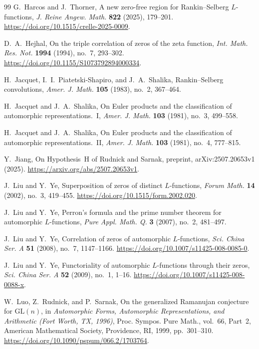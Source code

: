 \documentclass[11pt,reqno]{amsart}
\numberwithin{equation}{section}
\theoremstyle{definition}
\theoremstyle{remark}
\begin{document}
\begin{thebibliography}{99}
G.~Harcos and J.~Thorner,
A new zero-free region for Rankin--Selberg $L$-functions,
\emph{J. Reine Angew. Math.} \textbf{822} (2025), 179--201.
\url{https://doi.org/10.1515/crelle-2025-0009}.

D.~A.~Hejhal,
On the triple correlation of zeros of the zeta function,
\emph{Int. Math. Res. Not.} \textbf{1994} (1994), no.~7, 293--302.
\url{https://doi.org/10.1155/S1073792894000334}.

H.~Jacquet, I.~I.~Piatetski-Shapiro, and J.~A.~Shalika,
Rankin--Selberg convolutions,
\emph{Amer. J. Math.} \textbf{105} (1983), no.~2, 367--464.

H.~Jacquet and J.~A.~Shalika,
On Euler products and the classification of automorphic representations.~I,
\emph{Amer. J. Math.} \textbf{103} (1981), no.~3, 499--558.

H.~Jacquet and J.~A.~Shalika,
On Euler products and the classification of automorphic representations.~II,
\emph{Amer. J. Math.} \textbf{103} (1981), no.~4, 777--815.

Y.~Jiang,
On Hypothesis~H of Rudnick and Sarnak,
preprint, arXiv:2507.20653v1 (2025).
\url{https://arxiv.org/abs/2507.20653v1}.

J.~Liu and Y.~Ye,
Superposition of zeros of distinct $L$-functions,
\emph{Forum Math.} \textbf{14} (2002), no.~3, 419--455.
\url{https://doi.org/10.1515/form.2002.020}.

J.~Liu and Y.~Ye,
Perron's formula and the prime number theorem for automorphic $L$-functions,
\emph{Pure Appl. Math. Q.} \textbf{3} (2007), no.~2, 481--497.

J.~Liu and Y.~Ye,
Correlation of zeros of automorphic $L$-functions,
\emph{Sci. China Ser. A} \textbf{51} (2008), no.~7, 1147--1166.
\url{https://doi.org/10.1007/s11425-008-0085-0}.

J.~Liu and Y.~Ye,
Functoriality of automorphic $L$-functions through their zeros,
\emph{Sci. China Ser. A} \textbf{52} (2009), no.~1, 1--16.
\url{https://doi.org/10.1007/s11425-008-0088-x}.

W.~Luo, Z.~Rudnick, and P.~Sarnak,
On the generalized Ramanujan conjecture for $\mathrm{GL}(n)$,
in \emph{Automorphic Forms, Automorphic Representations, and Arithmetic
(Fort Worth, TX, 1996)},
Proc. Sympos. Pure Math., vol.~66, Part~2,
American Mathematical Society, Providence, RI, 1999, pp.~301--310.
\url{https://doi.org/10.1090/pspum/066.2/1703764}.


\end{thebibliography}
\end{document}
